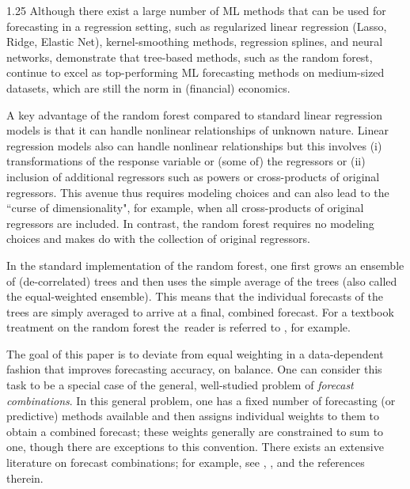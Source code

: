 \documentclass[12pt]{article}
\numberwithin{equation}{section}
\theoremstyle{plain}
\begin{document}
\begin{spacing}{1.25}
Although there exist a large number of ML methods that can be used for forecasting in a regression setting, such as regularized linear regression (Lasso, Ridge, Elastic Net), kernel-smoothing methods, regression splines, and neural networks, 
\citet{grinsztajn:2022} demonstrate that tree-based methods, such as the random forest, continue
to excel as top-performing ML forecasting methods on medium-sized datasets, which are still the norm in (financial) economics.

A key advantage of the random forest compared to standard linear regression models is that it can handle nonlinear relationships of unknown nature. Linear regression models also can handle nonlinear relationships but this involves (i) transformations of the response variable or (some of) the regressors or (ii) inclusion of additional regressors such as powers or cross-products of original regressors. This avenue thus requires modeling choices and can also lead to the ``curse of dimensionality", for example, when all cross-products of original regressors are included. In contrast, the random forest requires no modeling choices and makes do with the collection of original regressors.

In the standard implementation of the random forest, one first grows an
ensemble of (de-correlated) trees and then uses the simple average of
the trees (also called the equal-weighted ensemble). 
This means that the individual forecasts of the trees are simply averaged to
arrive at a final, combined forecast. For a textbook treatment on the
random forest the~reader is referred to
\citet[Chapter~15]{hastie:tibshirani:freedman:2017}, for example.

The goal of this paper is to deviate from equal weighting in a
data-dependent fashion that improves forecasting accuracy, on balance.
One can consider this task to be a special case of the general, well-studied problem of {\em forecast combinations}. In this
general problem, one has a fixed number of forecasting (or predictive) methods available and then assigns individual weights to them to obtain a combined forecast; these weights generally are constrained to sum to one, though there are exceptions to this convention.
There exists an extensive literature on forecast combinations; for
example, see \citet[Chapter 14]{elliott:timmermann:2016},
\cite{wang:hyndman:li:Kang:2022}, and the references therein.



\end{spacing}
\end{document}
